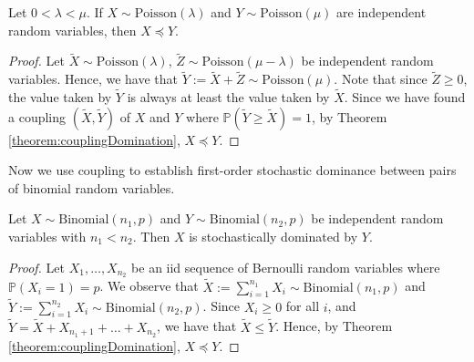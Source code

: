 \begin{theorem}
	Let $0 < \lambda < \mu$. If $X \sim \text{Poisson}(\lambda)$ and $Y \sim \text{Poisson}(\mu)$ are independent random variables, then $X \preceq Y$. 
\end{theorem}

\begin{proof}
	Let $\tilde{X} \sim \text{Poisson}(\lambda)$, $\tilde{Z} \sim \text{Poisson}(\mu - \lambda)$ be independent random variables. Hence, we have that $\tilde{Y} := \tilde{X} + \tilde{Z} \sim \text{Poisson}(\mu)$. Note that since $\tilde{Z} \geq 0$, the value taken by $\tilde{Y}$ is always at least the value taken by $\tilde{X}$. Since we have found a coupling $(\tilde{X}, \tilde{Y})$ of $X$ and $Y$ where $\mathbb{P}(\tilde{Y} \geq \tilde{X}) = 1$, by Theorem \ref{theorem:couplingDomination}, $X \preceq Y$.
\end{proof}

Now we use coupling to establish first-order stochastic dominance between pairs of binomial random variables.

\begin{theorem}
	Let $X \sim \text{Binomial}(n_1, p)$ and $Y \sim \text{Binomial}(n_2, p)$ be independent random variables with $n_1 < n_2$. Then $X$ is stochastically dominated by $Y$.
\end{theorem}

\begin{proof}
	Let $X_1, \dots, X_{n_2}$ be an iid sequence of Bernoulli random variables where $\mathbb{P}(X_i = 1) = p$. We observe that $\tilde{X} := \sum_{i=1}^{n_1} X_i \sim \text{Binomial}(n_1, p)$ and $\tilde{Y} := \sum_{i=1}^{n_2} X_i \sim \text{Binomial}(n_2, p)$. Since $X_i \geq 0$ for all $i$, and $\tilde{Y} = \tilde{X} + X_{n_1 + 1} + \dots + X_{n_2}$, we have that $\tilde{X} \leq \tilde{Y}$. Hence, by Theorem \ref{theorem:couplingDomination}, $X \preceq Y$.
\end{proof}


